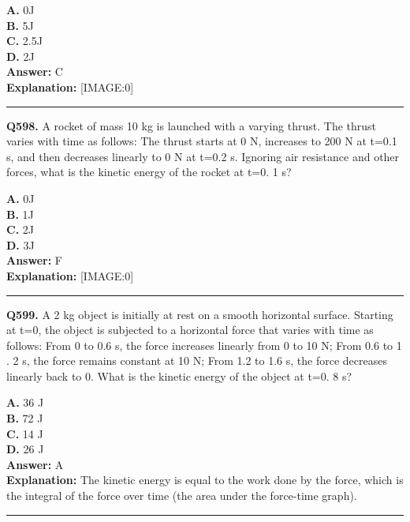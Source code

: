 \documentclass[12pt]{article}
\begin{document}
\textbf{A.} 0J \\
\textbf{B.} 5J \\
\textbf{C.} 2.5J \\
\textbf{D.} 2J \\

\textbf{Answer:} C \\
\textbf{Explanation:} [IMAGE:0]

\hrule
\vspace{1em}


\noindent
\textbf{Q598.} A rocket of mass 10 kg is launched with a varying thrust. The thrust varies with time as follows:
The thrust starts at 0 N, increases to 200 N at t=0.1 s, and then decreases linearly to 0 N at t=0.2 s.
Ignoring air resistance and other forces, what is the kinetic energy of the rocket at t=0.
1
s?



\textbf{A.} 0J \\
\textbf{B.} 1J \\
\textbf{C.} 2J \\
\textbf{D.} 3J \\

\textbf{Answer:} F \\
\textbf{Explanation:} [IMAGE:0]

\hrule
\vspace{1em}


\noindent
\textbf{Q599.} A
2
kg object is initially at rest on a smooth horizontal surface. Starting at t=0, the object is subjected to a horizontal force that varies with time as follows:
\cdot 
From 0 to 0.6 s, the force increases linearly from 0 to
10
N;
\cdot 
From 0.6 to 1
.
2 s, the force remains constant at
10
N;
\cdot 
From
1.2
to
1.6
s, the force decreases linearly back to 0.
What is the kinetic energy of the object at t=0.
8
s?



\textbf{A.} 36
J \\
\textbf{B.} 72 J \\
\textbf{C.} 14 J \\
\textbf{D.} 26 J \\

\textbf{Answer:} A \\
\textbf{Explanation:} The kinetic energy is equal to the work done by the force, which is the integral of the force over time (the area under the force-time graph).

\hrule
\vspace{1em}
\end{document}
